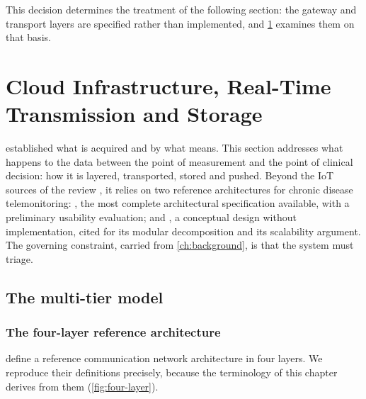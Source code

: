 \documentclass[12pt,a4paper,oneside]{report}
\begin{document}

This decision determines the treatment of the following section: the gateway and transport layers are specified rather than implemented, and \cref{sec:cloud} examines them on that basis.

\section{Cloud Infrastructure, Real-Time Transmission and Storage}\label{sec:cloud}

 established what is acquired and by what means. This section addresses what happens to the data between the point of measurement and the point of clinical decision: how it is layered, transported, stored and pushed. Beyond the IoT sources of the review \parencite{efendi2025,liu2025review}, it relies on two reference architectures for chronic disease telemonitoring: \textcite{mucchi2021}, the most complete architectural specification available, with a preliminary usability evaluation; and \textcite{yazdani2018}, a conceptual design without implementation, cited for its modular decomposition and its scalability argument. The governing constraint, carried from \cref{ch:background}, is that the system must triage.


\subsection{The multi-tier model}\label{sec:multitier}

\subsubsection{The four-layer reference architecture}

\Textcite{mucchi2021} define a reference communication network architecture in four layers. We reproduce their definitions precisely, because the terminology of this chapter derives from them (\cref{fig:four-layer}).
\end{document}
